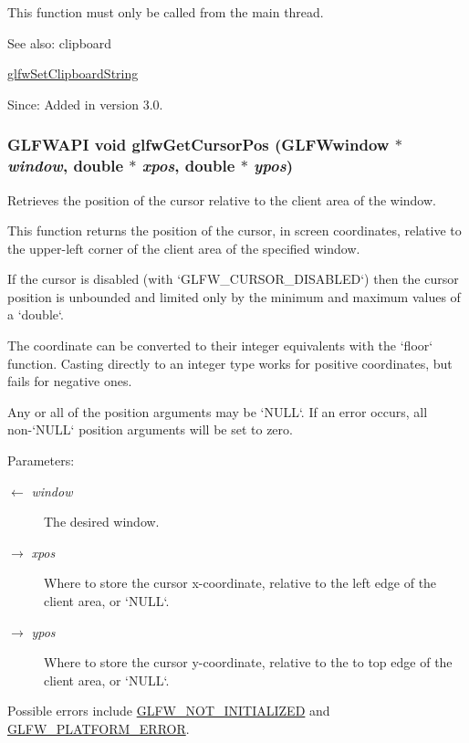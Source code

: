 This function must only be called from the main thread.

\begin{Desc}
\item[See also:]clipboard 

\hyperlink{group__input_g7a580309bbc185a0459c3559021d2fd7}{glfwSetClipboardString}\end{Desc}
\begin{Desc}
\item[Since:]Added in version 3.0. \end{Desc}
\hypertarget{group__input_gd289438eb7cf53d11eca685373f44105}{
\subsubsection[glfwGetCursorPos]{\setlength{\rightskip}{0pt plus 5cm}GLFWAPI void glfwGetCursorPos ({\bf GLFWwindow} $\ast$ {\em window}, \/  double $\ast$ {\em xpos}, \/  double $\ast$ {\em ypos})}}
\label{group__input_gd289438eb7cf53d11eca685373f44105}


Retrieves the position of the cursor relative to the client area of the window. 

This function returns the position of the cursor, in screen coordinates, relative to the upper-left corner of the client area of the specified window.

If the cursor is disabled (with `GLFW\_\-CURSOR\_\-DISABLED`) then the cursor position is unbounded and limited only by the minimum and maximum values of a `double`.

The coordinate can be converted to their integer equivalents with the `floor` function. Casting directly to an integer type works for positive coordinates, but fails for negative ones.

Any or all of the position arguments may be `NULL`. If an error occurs, all non-`NULL` position arguments will be set to zero.

\begin{Desc}
\item[Parameters:]
\begin{description}
\item[\mbox{$\leftarrow$} {\em window}]The desired window. \item[\mbox{$\rightarrow$} {\em xpos}]Where to store the cursor x-coordinate, relative to the left edge of the client area, or `NULL`. \item[\mbox{$\rightarrow$} {\em ypos}]Where to store the cursor y-coordinate, relative to the to top edge of the client area, or `NULL`.\end{description}
\end{Desc}
Possible errors include \hyperlink{group__errors_g2374ee02c177f12e1fa76ff3ed15e14a}{GLFW\_\-NOT\_\-INITIALIZED} and \hyperlink{group__errors_gd44162d78100ea5e87cdd38426b8c7a1}{GLFW\_\-PLATFORM\_\-ERROR}.

